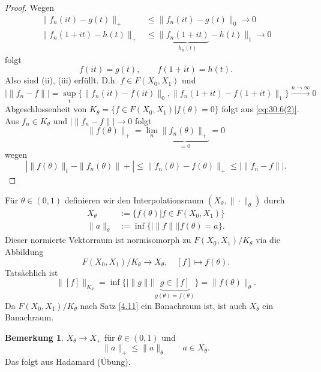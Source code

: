 \documentclass[
paper=a4,
bibtotocnumbered,
liststotocnumbered,
tablecaptionabove,
pointlessnumbers,
twoside,
openright,
10pt
]
{report}
\theoremstyle{definition}
\newtheorem*{rem}{Bemerkung}
\numberwithin{equation}{chapter}
\begin{document}
\begin{proof}
Wegen
\begin{align*}
\| f_n(it) - g(t) \|_+ &\le \| f_n(it) - g(t)\|_0 \to 0\\
\| f_n(1+it) - h(t)\|_+ &\le \| \underbrace{f_n(1+it)}_{h_n(t)} - h(t)\|_1 \to 0
\end{align*}
folgt
\begin{equation}
f(it) = g(t), \qquad f(1+it) = h(t).
\end{equation}
Also sind (ii), (iii) erfüllt. D.h. $f\in F(X_0, X_1)$ und
\begin{equation}
|\| f_n - f\| | = \sup_t \{ \| f_n(it) - f(it) \|_0, \| f_n(1+it) - f(1+it) \|_1\} \stackrel{n\to \infty}\to 0 
\end{equation}
Abgeschlossenheit von $K_\theta = \{ f\in F(X_0, X_1) | f(\theta) =0\}$ folgt aus \eqref{eq:30.6(2)}. Aus $f_n \in  K_\theta$ und $|\| f_n - f\| | \to 0$ folgt 
\begin{equation}
\| f(\theta) \|_+ = \lim_n \underbrace{\| f_n(\theta) \|_+}_{=0} =0
\end{equation}
wegen
\begin{equation}
| \| f(\theta) \|_t - \| f_n(\theta) \|+ | \le \| f_n(\theta) - f(\theta) \|_+ \le | \| f_n - f\| |.
\end{equation}
\end{proof}


Für $\theta \in (0,1)$ definieren wir den Interpolationsraum $(X_\theta, \| \cdot \|_\theta )$ durch
\begin{align*}
X_\theta &:= \{ f(\theta) | f \in F(X_0, X_1)\}\\
\| a\|_\theta &:= \inf\{ |\| f\| | | f(\theta) =a\}.
\end{align*}
Dieser normierte Vektorraum ist normisomorph zu $F(X_0, X_1) /K_\theta$ via die Abbildung
\begin{equation}
F(X_0, X_1) /K_\theta \to X_\theta, \quad [f] \mapsto f(\theta).
\end{equation}
Tatsächlich ist
\begin{equation}
\| [f] \|_{K_\theta} = \inf \{ |\| g\| | | \underbrace{g\in [f]}_{g(\theta) = f(\theta)} \}= \| f(\theta)\|_\theta.
\end{equation}
Da $F(X_0, X_1) /K_\theta$ nach Satz \ref{4.11} ein Banachraum ist, ist auch $X_\theta$ ein Banachraum.
\begin{rem}
$X_\theta \to X_+$ für $\theta \in (0,1)$ und 
\begin{equation}
\| a\|_+ \le \| a\|_\theta \qquad a\in X_\theta.
\end{equation}
Das folgt aus Hadamard (Übung).
\end{rem}
\end{document}
